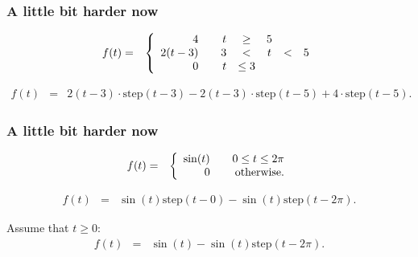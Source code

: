 \begin{frame}
  \frametitle{A little bit harder now}

  \begin{eqnarray*}
      f(t) & = & 
      \left\{
        \begin{array}{r@{\hspace{2em}}rcccl}
          4 & t & \geq & 5 \\
          2(t-3) & 3 & < & t & < & 5 \\
          0 & t & \leq 3 
        \end{array}
      \right.
  \end{eqnarray*}

  {
    \begin{eqnarray*}
      f(t) & = & 2(t-3)\cdot\mathrm{step}(t-3) -
      2(t-3)\cdot\mathrm{step}(t-5) + 4\cdot\mathrm{step}(t-5).
    \end{eqnarray*}
  }


\end{frame}


\begin{frame}
  \frametitle{A little bit harder now}

  \begin{eqnarray*}
      f(t) & = & 
      \left\{
        \begin{array}{r@{\hspace{2em}}r}
          \sin(t) & 0 \leq t \leq 2\pi \\
          0 &  \mathrm{otherwise}.
        \end{array}
      \right.
  \end{eqnarray*}

  {
    \begin{eqnarray*}
      f(t) & = & \sin(t)\mathrm{step}(t-0) - \sin(t)\mathrm{step}(t-2\pi).
    \end{eqnarray*}
  }


  {
    Assume that $t\geq 0$:
    \begin{eqnarray*}
      f(t) & = & \sin(t) - \sin(t)\mathrm{step}(t-2\pi).
    \end{eqnarray*}
  }


\end{frame}



